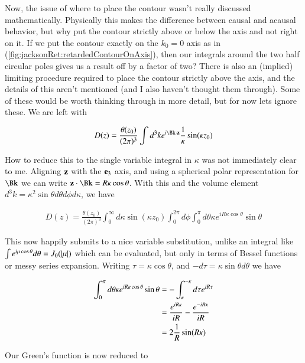 Now, the issue of where to place the contour wasn't really discussed mathematically.  Physically this makes the difference between causal and acausal behavior, but why put the contour strictly above or below the axis and not right on it.  If we put the contour exactly on the $k_0 = 0$ axis as in (\ref{fig:jacksonRet:retardedContourOnAxis}), then our integrals around the two half circular poles gives us a result off by a factor of two?  There is also an (implied) limiting procedure required to place the contour strictly above the axis, and the details of this aren't mentioned (and I also haven't thought them through).  Some of these would be worth thinking through in more detail, but for now lets ignore these.  We are left with

\begin{align}\label{eqn:jacksonRet:boo14}
D(z) = \frac{\theta(z_0)}{(2\pi)^3} \int d^3 k e^{i \Bk \cdot \Bz} \inv{\kappa} \sin(\kappa z_0)
\end{align}

How to reduce this to the single variable integral in $\kappa$ was not immediately clear to me.  Aligning $\mathbf{z}$ with the $\mathbf{e}_3$ axis, and using a spherical polar representation for $\Bk$ we can write $\Bz \cdot \Bk = R \kappa \cos\theta$.  With this and the volume element $d^3 k = \kappa^2 \sin\theta d\theta d\phi d\kappa$, we have

\begin{align}\label{eqn:jacksonRet:boo15}
D(z) = \frac{\theta(z_0)}{(2\pi)^3} \int_0^\infty d\kappa \sin(\kappa z_0) \int_0^{2\pi} d\phi \int_0^\pi d\theta \kappa e^{i R \kappa \cos\theta} \sin\theta
\end{align}

This now happily submits to a nice variable substitution, unlike an integral like $\int e^{i \mu \cos\theta} d\theta = J_0(\left\lvert{\mu}\right\rvert)$ which can be evaluated, but only in terms of Bessel functions or messy series expansion.  Writing $\tau = \kappa \cos\theta$, and $-d\tau = \kappa \sin\theta d\theta$ we have

\begin{align*}
\int_0^\pi d\theta \kappa e^{i R \kappa \cos\theta} \sin\theta
&=
-\int_{\kappa}^{-\kappa} d\tau e^{i R \tau} \\
&=
\frac{e^{i R \kappa}}{i R} -\frac{e^{-i R \kappa}}{i R} \\
&=
2 \frac{1}{R} \sin(R \kappa)
\end{align*}

Our Green's function is now reduced to

